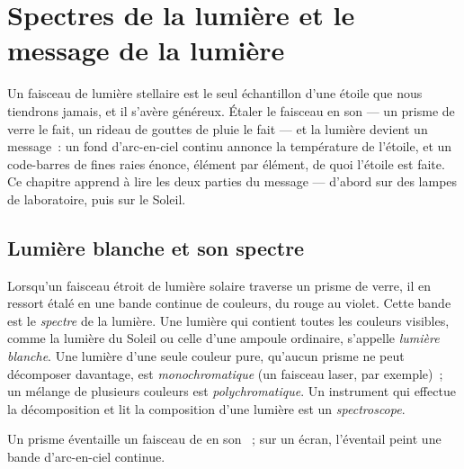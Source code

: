 \chapter{Spectres de la lumière et le message de la lumière}\label{ch:g10:light-spectra}

Un faisceau de lumière stellaire est le seul échantillon d'une étoile que
nous tiendrons jamais, et il s'avère généreux. Étaler le faisceau en son
 --- un prisme de verre le fait, un rideau de gouttes de pluie le
fait --- et la lumière devient un message~: un fond d'arc-en-ciel
continu annonce la température de l'étoile, et un code-barres de fines
raies énonce, élément par élément, de quoi l'étoile est faite. Ce
chapitre apprend à lire les deux parties du message --- d'abord sur des
lampes de laboratoire, puis sur le Soleil.

\section{Lumière blanche et son spectre}

\begin{definition}\label{def:g10:light-spectra:white}
Lorsqu'un faisceau étroit de lumière solaire traverse un prisme de
verre, il en ressort étalé en une bande continue de couleurs, du rouge
au violet. Cette bande est le \emph{spectre} de la
lumière. Une lumière qui contient toutes les couleurs visibles, comme
la lumière du Soleil ou celle d'une ampoule ordinaire, s'appelle
\emph{lumière blanche}. Une lumière d'une seule
couleur pure, qu'aucun prisme ne peut décomposer davantage, est
\emph{monochromatique} (un faisceau
laser, par exemple)~; un mélange de plusieurs couleurs est
\emph{polychromatique}. Un instrument
qui effectue la décomposition et lit la composition d'une lumière est
un \emph{spectroscope}.
\end{definition}

\begin{omfigure}

{\small Un prisme éventaille un faisceau de  en son
~; sur un écran, l'éventail peint une bande d'arc-en-ciel
continue.}
\end{omfigure}

